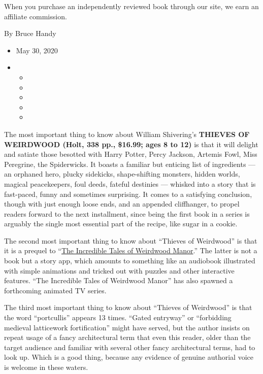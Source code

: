 When you purchase an independently reviewed book through our site, we
earn an affiliate commission.

By Bruce Handy

\begin{itemize}
\item
  May 30, 2020
\item
  \begin{itemize}
  \item
  \item
  \item
  \item
  \item
  \end{itemize}
\end{itemize}

The most important thing to know about William Shivering's
\textbf{THIEVES OF WEIRDWOOD (Holt, 338 pp., \$16.99; ages 8 to 12)} is
that it will delight and satiate those besotted with Harry Potter, Percy
Jackson, Artemis Fowl, Miss Peregrine, the Spiderwicks. It boasts a
familiar but enticing list of ingredients --- an orphaned hero, plucky
sidekicks, shape-shifting monsters, hidden worlds, magical peacekeepers,
foul deeds, fateful destinies --- whisked into a story that is
fast-paced, funny and sometimes surprising. It comes to a satisfying
conclusion, though with just enough loose ends, and an appended
cliffhanger, to propel readers forward to the next installment, since
being the first book in a series is arguably the single most essential
part of the recipe, like sugar in a cookie.

The second most important thing to know about ``Thieves of Weirdwood''
is that it is a prequel to ``\href{https://weirdwood.com/the-app/}{The
Incredible Tales of Weirdwood Manor}.'' The latter is not a book but a
story app, which amounts to something like an audiobook illustrated with
simple animations and tricked out with puzzles and other interactive
features. ``The Incredible Tales of Weirdwood Manor'' has also spawned a
forthcoming animated TV series.

The third most important thing to know about ``Thieves of Weirdwood'' is
that the word ``portcullis'' appears 13 times. ``Gated entryway'' or
``forbidding medieval latticework fortification'' might have served, but
the author insists on repeat usage of a fancy architectural term that
even this reader, older than the target audience and familiar with
several other fancy architectural terms, had to look up. Which is a good
thing, because any evidence of genuine authorial voice is welcome in
these waters.

